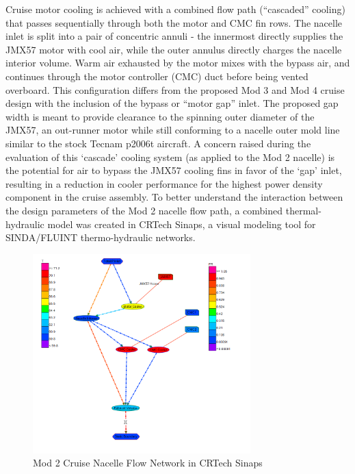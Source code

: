 \documentclass[]{aiaa-tc}%
\begin{document}
Cruise motor cooling is achieved with a combined flow path (“cascaded” cooling) that passes sequentially through both the motor and CMC fin rows.  The nacelle inlet is split into a pair of concentric annuli - the innermost directly supplies the JMX57 motor with cool air, while the outer annulus directly charges the nacelle interior volume.  Warm air exhausted by the motor mixes with the bypass air, and continues through the motor controller (CMC) duct before being vented overboard.  
This configuration differs from the proposed Mod 3 and Mod 4 cruise design with the inclusion of the bypass or “motor gap” inlet.  The proposed gap width is meant to provide clearance to the spinning outer diameter of the JMX57, an out-runner motor while still conforming to a nacelle outer mold line similar to the stock Tecnam p2006t aircraft. 
A concern raised during the evaluation of this ‘cascade’ cooling system (as applied to the Mod 2 nacelle) is the potential for air to bypass the JMX57 cooling fins in favor of the `gap' inlet, resulting in a reduction in cooler performance for the highest power density component in the cruise assembly.  
To better understand the interaction between the design parameters of the Mod 2 nacelle flow path, a combined thermal-hydraulic model was created in CRTech Sinaps, a visual modeling tool for SINDA/FLUINT thermo-hydraulic networks. 

\begin{figure}[!htb]%
	\centering
	\includegraphics[width=0.75\textwidth]{figures/sinaps_paramsweep.PNG}
	\caption{Mod 2 Cruise Nacelle Flow Network in CRTech Sinaps}
	\label{fig:Sinaps}
\end{figure}
\end{document}
